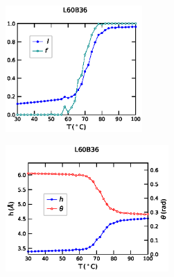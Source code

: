 \documentclass[12pt,masters,final]{UTRGVthesis}
\begin{document}
\begin{figure}[!h]
        \begin{subfigure}[b]{0.49\textwidth}
                \centering
                \includegraphics[height=1.9in, width=.8\textwidth]{L60B36_temp_lf.eps}
                \caption{}
                \label{fig:L60B36lf}
        \end{subfigure}%
        \hspace{3pt}
        \begin{subfigure}[b]{0.49\textwidth}
                \centering
                \includegraphics[height=1.9in, width=.8\textwidth]{L60B36_temp_h_theta.eps}
                \caption{}
                \label{fig:L60B36htheta}
        \end{subfigure}%
        

\end{figure}
\end{document}
